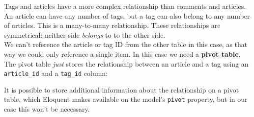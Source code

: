 Tags and articles have a more complex relationship than comments and articles. An article can have any number of tags, but a tag can also belong to any number of articles. This is a many-to-many relationship. These relationships are symmetrical: neither side \textit{belongs} to to the other side.
\\

We can't reference the article or tag ID from the other table in this case, as that way we could only reference a single item. In this case we need a \textbf{pivot table}. The pivot table \textit{just} stores the relationship between an article and a tag using an \texttt{article\_id} and a \texttt{tag\_id} column:


It is possible to store additional information about the relationship on a pivot table, which Eloquent makes available on the model's \texttt{pivot} property, but in our case this won't be necessary.


